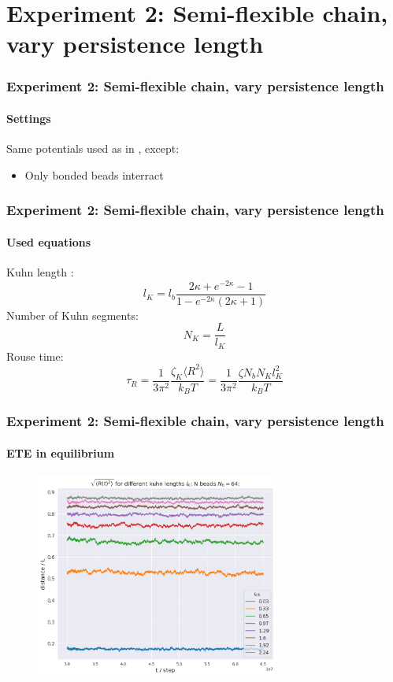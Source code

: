 \documentclass[handout]{beamer}
\newcommand{\mean}[1]{\langle #1 \rangle}
\begin{document}
\section{Experiment 2: Semi-flexible chain, vary persistence length}

\begin{frame}
    \frametitle{Experiment 2: Semi-flexible chain, vary persistence length}
    \framesubtitle{Settings}
    Same potentials used as in \cite[Section 2.1]{svaneborg_2020}, except:
    \begin{itemize}
        \item Only bonded beads interract
    \end{itemize}
\end{frame}

\begin{frame}
    \frametitle{Experiment 2: Semi-flexible chain, vary persistence length}
    \framesubtitle{Used equations}

    Kuhn length \cite{svaneborg_2020}:
    \begin{equation}
        l_K = l_b \frac{2\kappa + e^{-2 \kappa} - 1}{1-e^{-2\kappa}(2 \kappa + 1)}
    \end{equation}
    Number of Kuhn segments:
    \begin{equation} 
        N_K = \frac{L}{l_K}
    \end{equation}
    Rouse time:
    \begin{equation} \label{eq:tau_R_kuhn}
        \tau_R = \frac{1}{3 \pi^2} \frac{\zeta_{K} \mean{R^2}}{k_B T} = \frac{1}{3 \pi^2} \frac{\zeta N_b N_K l_K^2}{k_B T}
    \end{equation}
\end{frame}


\begin{frame}
    \frametitle{Experiment 2: Semi-flexible chain, vary persistence length}
    \framesubtitle{ETE in equilibrium}

    \begin{figure}[h]
        \includegraphics[width=8cm]{./4-exp-R_equi.png}
    \end{figure}
\end{frame}
\end{document}
